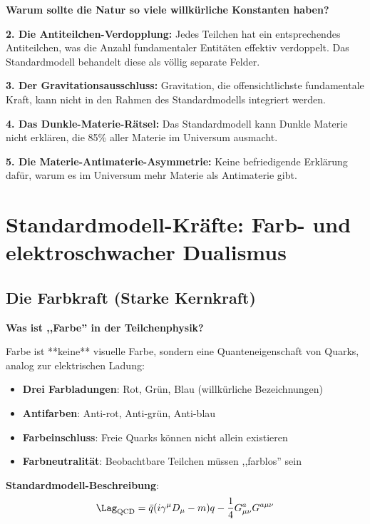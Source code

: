 	\textbf{Warum sollte die Natur so viele willkürliche Konstanten haben?}
	
	\textbf{2. Die Antiteilchen-Verdopplung:}
	Jedes Teilchen hat ein entsprechendes Antiteilchen, was die Anzahl fundamentaler Entitäten effektiv verdoppelt. Das Standardmodell behandelt diese als völlig separate Felder.
	
	\textbf{3. Der Gravitationsausschluss:}
	Gravitation, die offensichtlichste fundamentale Kraft, kann nicht in den Rahmen des Standardmodells integriert werden.
	
	\textbf{4. Das Dunkle-Materie-Rätsel:}
	Das Standardmodell kann Dunkle Materie nicht erklären, die 85\% aller Materie im Universum ausmacht.
	
	\textbf{5. Die Materie-Antimaterie-Asymmetrie:}
	Keine befriedigende Erklärung dafür, warum es im Universum mehr Materie als Antimaterie gibt.
	
	\section{Standardmodell-Kräfte: Farb- und elektroschwacher Dualismus}
	
	\subsection{Die Farbkraft (Starke Kernkraft)}
	
	\textbf{Was ist ,,Farbe'' in der Teilchenphysik?}
	
	Farbe ist **keine** visuelle Farbe, sondern eine Quanteneigenschaft von Quarks, analog zur elektrischen Ladung:
	
	\begin{itemize}
		\item \textbf{Drei Farbladungen}: Rot, Grün, Blau (willkürliche Bezeichnungen)
		\item \textbf{Antifarben}: Anti-rot, Anti-grün, Anti-blau
		\item \textbf{Farbeinschluss}: Freie Quarks können nicht allein existieren
		\item \textbf{Farbneutralität}: Beobachtbare Teilchen müssen ,,farblos'' sein
	\end{itemize}
	
	\textbf{Standardmodell-Beschreibung}:
	\begin{equation}
		\Lag_{\text{QCD}} = \bar{q} (i\gamma^\mu D_\mu - m) q - \frac{1}{4} G_{\mu\nu}^a G^{a\mu\nu}
	\end{equation}
	
